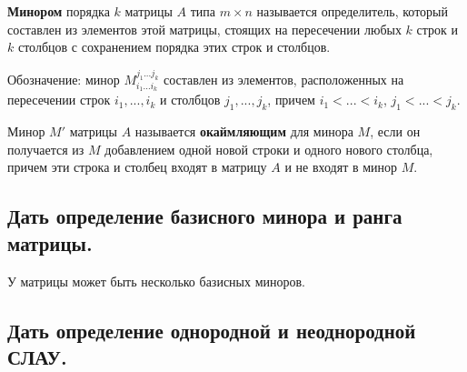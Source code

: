 {\bf{Минором}} порядка $k$ матрицы $A$ типа $m\times n$ называется определитель, который составлен из элементов этой матрицы, стоящих на пересечении любых $k$ строк и $k$ столбцов с сохранением порядка этих строк и столбцов.

Обозначение: минор $M^{j_1 ... j_k}_{i_1 ... i_k}$ составлен из элементов, расположенных на пересечении строк $i_1, ..., i_k$ и столбцов $j_1, ..., j_k$, причем $i_1<...<i_k$, $j_1<...<j_k$.

\vspace*{15pt}

Минор $M'$ матрицы $A$ называется {\bf{окаймляющим}} для минора $M$, если он получается из $M$ добавлением одной новой строки и одного нового столбца, причем эти строка и столбец входят в матрицу $A$ и не входят в минор $M$.

\subsection{Дать определение базисного минора и ранга матрицы.}


\vspace*{15pt}


У матрицы может быть несколько базисных миноров.

\subsection{Дать определение однородной и неоднородной СЛАУ.}



